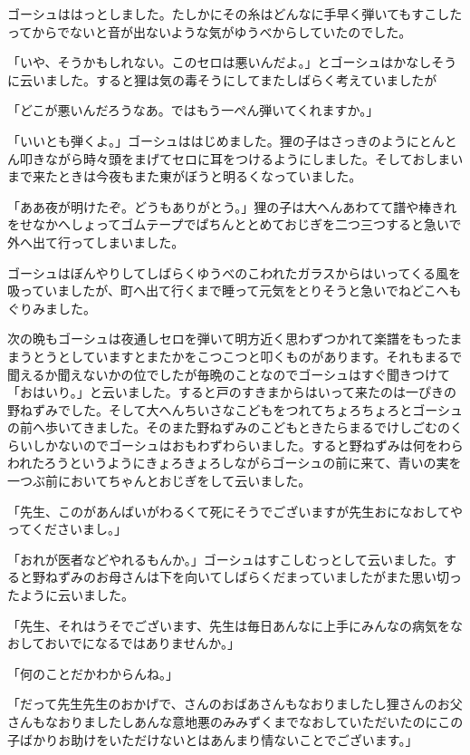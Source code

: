 \documentclass[uplatex,a5paper,twoside]{jsarticle}
\begin{document}
ゴーシュははっとしました。たしかにその糸はどんなに手早く弾いてもすこしたってからでないと音が出ないような気がゆうべからしていたのでした。

「いや、そうかもしれない。このセロは悪いんだよ。」とゴーシュはかなしそうに云いました。すると狸は気の毒そうにしてまたしばらく考えていましたが

「どこが悪いんだろうなあ。ではもう一ぺん弾いてくれますか。」

「いいとも弾くよ。」ゴーシュははじめました。狸の子はさっきのようにとんとん叩きながら時々頭をまげてセロに耳をつけるようにしました。そしておしまいまで来たときは今夜もまた東がぼうと明るくなっていました。

「ああ夜が明けたぞ。どうもありがとう。」狸の子は大へんあわてて譜や棒きれをせなかへしょってゴムテープでぱちんととめておじぎを二つ三つすると急いで外へ出て行ってしまいました。

ゴーシュはぼんやりしてしばらくゆうべのこわれたガラスからはいってくる風を吸っていましたが、町へ出て行くまで睡って元気をとりそうと急いでねどこへもぐりみました。

次の晩もゴーシュは夜通しセロを弾いて明方近く思わずつかれて楽譜をもったままうとうとしていますとまたかをこつこつと叩くものがあります。それもまるで聞えるか聞えないかの位でしたが毎晩のことなのでゴーシュはすぐ聞きつけて「おはいり。」と云いました。すると戸のすきまからはいって来たのは一ぴきの野ねずみでした。そして大へんちいさなこどもをつれてちょろちょろとゴーシュの前へ歩いてきました。そのまた野ねずみのこどもときたらまるでけしごむのくらいしかないのでゴーシュはおもわずわらいました。すると野ねずみは何をわらわれたろうというようにきょろきょろしながらゴーシュの前に来て、青いの実を一つぶ前においてちゃんとおじぎをして云いました。

「先生、このがあんばいがわるくて死にそうでございますが先生おになおしてやってくださいまし。」

「おれが医者などやれるもんか。」ゴーシュはすこしむっとして云いました。すると野ねずみのお母さんは下を向いてしばらくだまっていましたがまた思い切ったように云いました。

「先生、それはうそでございます、先生は毎日あんなに上手にみんなの病気をなおしておいでになるではありませんか。」

「何のことだかわからんね。」

「だって先生先生のおかげで、さんのおばあさんもなおりましたし狸さんのお父さんもなおりましたしあんな意地悪のみみずくまでなおしていただいたのにこの子ばかりお助けをいただけないとはあんまり情ないことでございます。」
\end{document}
